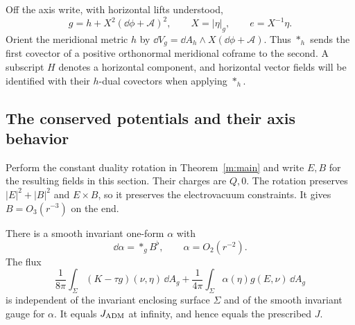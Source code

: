 Off the axis write, with horizontal lifts understood,
\begin{equation}\label{a:metric-splitting}
 g=h+X^2(\dd\phi+\mathcal A)^2,
 \qquad X=|\eta|_g,\qquad e=X^{-1}\eta.
\end{equation}
Orient the meridional metric $h$ by
$\dd V_g=\dd A_h\wedge X(\dd\phi+\mathcal A)$.
Thus $*_h$ sends the first covector of a positive orthonormal
meridional coframe to the second.  A subscript $H$ denotes a
horizontal component, and horizontal vector fields will be identified
with their $h$-dual covectors when applying $*_h$.

\subsection{The conserved potentials and their axis behavior}

Perform the constant duality rotation in Theorem~\ref{m:main} and
write $E,B$ for the resulting fields in this section.  Their charges
are $Q,0$.  The rotation preserves $|E|^2+|B|^2$ and $E\times B$,
so it preserves the electrovacuum constraints.  It gives
$B=O_3(r^{-3})$ on the end.

\begin{lemma}
\label{a:angular-momentum}
There is a smooth invariant one-form $\alpha$ with
\[
 \dd\alpha=*_g B^\flat,\qquad \alpha=O_2(r^{-2}).
\]
The flux
\begin{equation}\label{a:total-flux}
 \frac1{8\pi}\int_\Sigma(K-\tau g)(\nu,\eta)\,\dd A_g
 +\frac1{4\pi}\int_\Sigma\alpha(\eta)g(E,\nu)\,\dd A_g
\end{equation}
is independent of the invariant enclosing surface $\Sigma$ and of
the smooth invariant gauge for $\alpha$.  It equals $J_{\rm ADM}$
at infinity, and hence equals the prescribed $J$.
\end{lemma}

